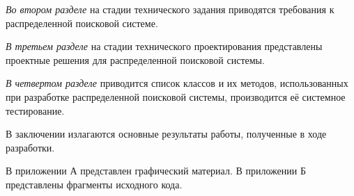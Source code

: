 \emph{Во втором разделе} на стадии технического задания приводятся требования к распределенной поисковой системе.

\emph{В третьем разделе} на стадии технического проектирования представлены проектные решения для распределенной поисковой системы.

\emph{В четвертом разделе} приводится список классов и их методов, использованных при разработке распределенной поисковой системы, производится её системное тестирование.

В заключении излагаются основные результаты работы, полученные в ходе разработки.

В приложении А представлен графический материал.
В приложении Б представлены фрагменты исходного кода. 